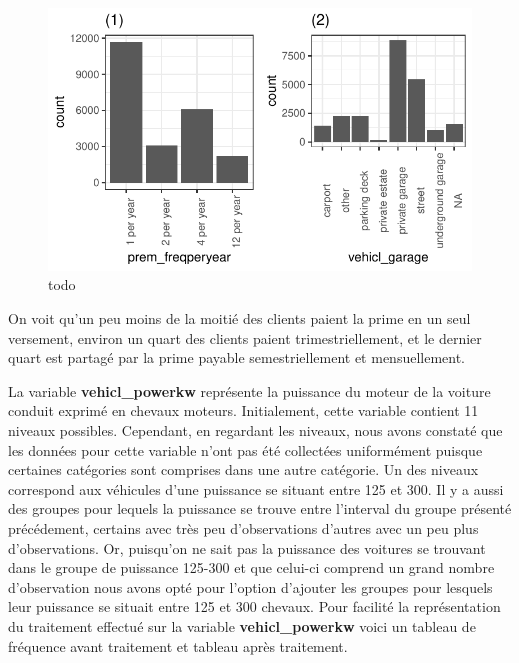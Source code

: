 \documentclass[
]{article}
\begin{document}
\begin{figure}

{\centering \includegraphics{01-01-Pretraitement_files/figure-latex/graph_prem_freqperyear-1} 

}

\caption{\label{fig:freqperyearAndvehiclGarage}todo}\label{fig:graph_prem_freqperyear}
\end{figure}

On voit qu'un peu moins de la moitié des clients paient la prime en un
seul versement, environ un quart des clients paient trimestriellement,
et le dernier quart est partagé par la prime payable semestriellement et
mensuellement.

La variable \textbf{vehicl\_powerkw} représente la puissance du moteur
de la voiture conduit exprimé en chevaux moteurs. Initialement, cette
variable contient 11 niveaux possibles. Cependant, en regardant les
niveaux, nous avons constaté que les données pour cette variable n'ont
pas été collectées uniformément puisque certaines catégories sont
comprises dans une autre catégorie. Un des niveaux correspond aux
véhicules d'une puissance se situant entre 125 et 300. Il y a aussi des
groupes pour lequels la puissance se trouve entre l'interval du groupe
présenté précédement, certains avec très peu d'observations d'autres
avec un peu plus d'observations. Or, puisqu'on ne sait pas la puissance
des voitures se trouvant dans le groupe de puissance 125-300 et que
celui-ci comprend un grand nombre d'observation nous avons opté pour
l'option d'ajouter les groupes pour lesquels leur puissance se situait
entre 125 et 300 chevaux. Pour facilité la représentation du traitement
effectué sur la variable \textbf{vehicl\_powerkw} voici un tableau de
fréquence avant traitement et tableau après traitement.
\end{document}
